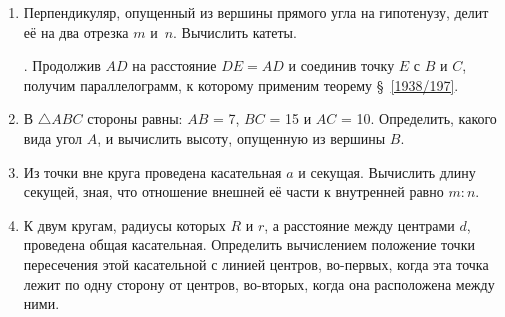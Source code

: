 {\begin{enumerate}
\item
Перпендикуляр, опущенный из вершины прямого угла на гипотенузу, делит её на два отрезка $m$ и~$n$.
Вычислить катеты.

\smallskip
{}.
Продолжив $AD$ на расстояние $DE=AD$ и соединив точку $E$ с $B$ и $C$, получим параллелограмм, к которому применим теорему §~\ref{1938/197}.

\item
В $\triangle ABC$ стороны равны:
$AB$ = 7, $BC$ = 15 и $AC$ = 10.
Определить, какого вида угол $A$, и вычислить высоту, опущенную из вершины $B$.

\item
Из точки вне круга проведена касательная $a$ и секущая.
Вычислить длину секущей, зная, что отношение внешней её части к внутренней равно $m:n$.

\item
К двум кругам, радиусы которых $R$ и $r$, а расстояние между центрами $d$, проведена общая касательная.
Определить вычислением положение точки пересечения этой касательной с линией центров, во-первых, когда эта точка лежит по одну сторону от центров, во-вторых, когда она расположена между ними.

\end{enumerate}

}

